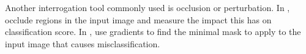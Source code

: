   Another interrogation tool commonly used is occlusion or perturbation. 
  In \cite{zeiler_visualizing_2014}, \citeauthor{zeiler_visualizing_2014} occlude regions in the
  input image and measure the impact this has on classification score. In
  \cite{fong_interpretable_2017}, \citeauthor{fong_interpretable_2017} use
  gradients to find the minimal mask to apply to the input image that causes
  misclassification.

